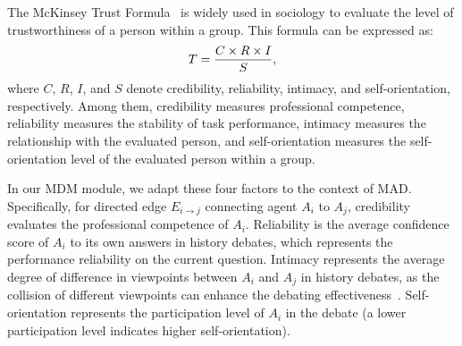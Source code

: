 The McKinsey Trust Formula~\citep{lamarre2012mckinsey} is widely used in sociology to evaluate the level of trustworthiness of a person within a group. This formula can be expressed as:
\begin{equation}
\setlength{\abovedisplayskip}{1mm}
\setlength{\belowdisplayskip}{1mm}
  \label{MTF}
  T= \frac{C\times R\times I}{S},
\end{equation}
\noindent where $C$, $R$, $I$, and $S$ denote credibility, reliability, intimacy, and self-orientation, respectively. Among them, credibility measures professional competence, reliability measures the stability of task performance, intimacy measures the relationship with the evaluated person, and self-orientation measures the self-orientation level of the evaluated person within a group.

In our MDM module, we adapt these four factors to the context of MAD. Specifically, for directed edge $E_{i\to j}$ connecting agent $A_{i}$ to $A_{j}$, credibility evaluates the professional competence of $A_{i}$. Reliability is the average confidence score of $A_{i}$ to its own answers in history debates, which represents the performance reliability on the current question. Intimacy represents the average degree of difference in viewpoints between $A_{i}$ and $A_{j}$ in history debates, as the collision of different viewpoints can enhance the debating effectiveness~\cite{xiong2023examining}. Self-orientation represents the participation level of $A_{i}$ in the debate (a lower participation level indicates higher self-orientation).